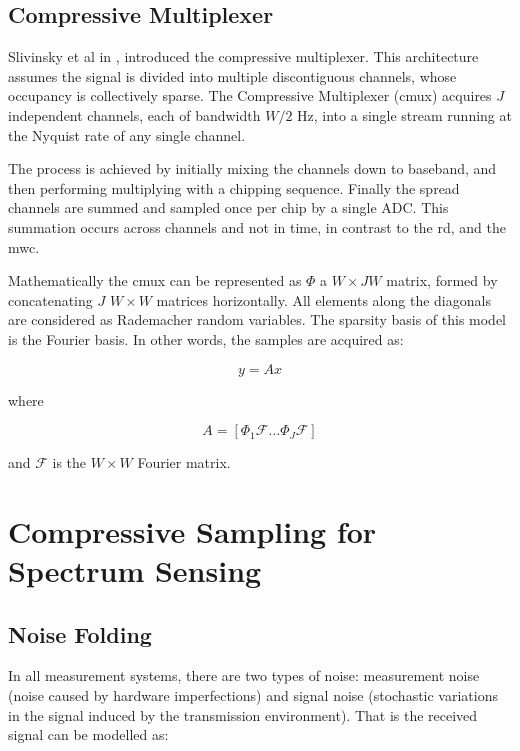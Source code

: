 \subsection{Compressive Multiplexer}
Slivinsky et al in \cite{Slavinsky2011}, introduced the compressive multiplexer. This architecture assumes the signal is divided into multiple discontiguous channels, whose occupancy is collectively sparse. The Compressive Multiplexer (\gls{cmux}) acquires \(J\) independent channels, each of bandwidth \(W/2\) Hz, into a single stream running at the Nyquist rate of any single channel. 

The process is achieved by initially mixing the channels down to baseband, and then performing multiplying with a chipping sequence. Finally the spread channels are summed and sampled once per chip by a single ADC. This summation occurs across channels and not in time, in contrast to the \gls{rd}, and the \gls{mwc}.

Mathematically the \gls{cmux} can be represented as \(\Phi\) a \(W \times JW\) matrix, formed by concatenating \(J\) \(W \times W\) matrices horizontally. All elements along the diagonals are considered as Rademacher random variables. The sparsity basis of this model is the Fourier basis. In other words, the samples are acquired as:

\begin{equation}
y = Ax
\end{equation}

where 

\begin{equation}
A = \left[\Phi_1 \mathcal{F} \ldots \Phi_J \mathcal{F}\right]
\end{equation}

and \(\mathcal{F}\) is the \(W \times W\) Fourier matrix. 

\section{Compressive Sampling for Spectrum Sensing}

\subsection{Noise Folding}
In all measurement systems, there are two types of noise: measurement noise (noise caused by hardware imperfections) and signal noise (stochastic variations in the signal induced by the transmission environment). That is the received signal can be modelled as:

